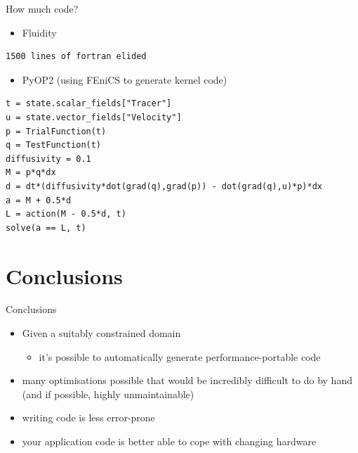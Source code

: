 \documentclass[presentation]{beamer}
\begin{document}
\begin{frame}[fragile,label={sec:orgheadline19}]{How much code?}
 \begin{itemize}
\item Fluidity
\end{itemize}
\begin{verbatim}
1500 lines of fortran elided
\end{verbatim}
\begin{itemize}
\item PyOP2 (using FEniCS to generate kernel code)
\end{itemize}
\begin{verbatim}
t = state.scalar_fields["Tracer"]
u = state.vector_fields["Velocity"]
p = TrialFunction(t)
q = TestFunction(t)
diffusivity = 0.1
M = p*q*dx
d = dt*(diffusivity*dot(grad(q),grad(p)) - dot(grad(q),u)*p)*dx
a = M + 0.5*d
L = action(M - 0.5*d, t)
solve(a == L, t)
\end{verbatim}
\end{frame}
\section{Conclusions}
\label{sec:orgheadline24}

\begin{frame}[label={sec:orgheadline21}]{Conclusions}
\begin{itemize}
\item Given a suitably constrained domain
\begin{itemize}
\item it's possible to automatically generate performance-portable code
\end{itemize}
\item many optimisations possible that would be incredibly difficult to do
by hand (and if possible, highly unmaintainable)
\item writing code is less error-prone
\item your application code is better able to cope with changing hardware
\end{itemize}
\end{frame}
\end{document}
